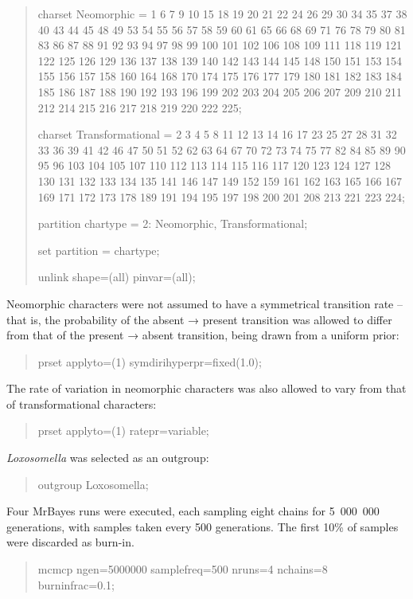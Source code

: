 \documentclass[openany]{book}
\begin{document}
\begin{quote}
charset Neomorphic = 1 6 7 9 10 15 18 19 20 21 22 24 26 29 30 34 35 37
38 40 43 44 45 48 49 53 54 55 56 57 58 59 60 61 65 66 68 69 71 76 78 79
80 81 83 86 87 88 91 92 93 94 97 98 99 100 101 102 106 108 109 111 118
119 121 122 125 126 129 136 137 138 139 140 142 143 144 145 148 150 151
153 154 155 156 157 158 160 164 168 170 174 175 176 177 179 180 181 182
183 184 185 186 187 188 190 192 193 196 199 202 203 204 205 206 207 209
210 211 212 214 215 216 217 218 219 220 222 225;

charset Transformational = 2 3 4 5 8 11 12 13 14 16 17 23 25 27 28 31 32
33 36 39 41 42 46 47 50 51 52 62 63 64 67 70 72 73 74 75 77 82 84 85 89
90 95 96 103 104 105 107 110 112 113 114 115 116 117 120 123 124 127 128
130 131 132 133 134 135 141 146 147 149 152 159 161 162 163 165 166 167
169 171 172 173 178 189 191 194 195 197 198 200 201 208 213 221 223 224;

partition chartype = 2: Neomorphic, Transformational;

set partition = chartype;

unlink shape=(all) pinvar=(all);
\end{quote}

Neomorphic characters were not assumed to have a symmetrical transition
rate -- that is, the probability of the absent → present transition was
allowed to differ from that of the present → absent transition, being
drawn from a uniform prior:

\begin{quote}
prset applyto=(1) symdirihyperpr=fixed(1.0);
\end{quote}

The rate of variation in neomorphic characters was also allowed to vary
from that of transformational characters:

\begin{quote}
prset applyto=(1) ratepr=variable;
\end{quote}

\emph{Loxosomella} was selected as an outgroup:

\begin{quote}
outgroup Loxosomella;
\end{quote}

Four MrBayes runs were executed, each sampling eight chains for
5~000~000 generations, with samples taken every 500 generations. The
first 10\% of samples were discarded as burn-in.

\begin{quote}
mcmcp ngen=5000000 samplefreq=500 nruns=4 nchains=8 burninfrac=0.1;
\end{quote}
\end{document}
